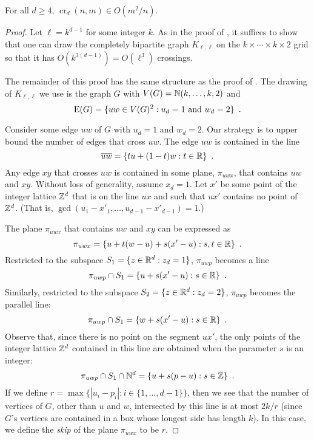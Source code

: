 \documentclass{patmorin}
\DeclareMathOperator{\crs}{cr}
\begin{document}
\begin{thm}
  For all $d\ge 4$, $\crs_d(n,m)\in O(m^2/n)$.
\end{thm}

\begin{proof}
  Let $\ell=k^{d-1}$ for some integer $k$.  As in the proof of
  , it suffices to show that one can draw the
  completely bipartite graph $K_{\ell,\ell}$ on the $k\times\cdots\times
  k\times 2$ grid so that it has $O(k^{3(d-1)})=O(\ell^3)$ crossings.

  The remainder of this proof has the same structure as the proof of
  .  The drawing of $K_{\ell,\ell}$ we use is the graph
  $G$ with $V(G)=\mathbb{N}(k,\ldots,k,2)$ and
  \[
    \mathrm{E}(G) = \{ uw\in V(G)^2 :\mbox{$u_d = 1$ and $w_d = 2$} \} \enspace .
  \]
  
  Consider some edge $uw$ of $G$ with $u_d=1$ and $w_d=2$.  Our strategy
  is to upper bound the number of edges that cross $uw$.  The edge $uw$
  is contained in the line
  \[  
    \overline{uw} = \{ tu + (1-t)w : t\in \mathbb{R} \} \enspace . 
  \]
  Any edge $xy$ that crosses $uw$ is contained in some plane, $\pi_{uwx}$,
  that contains $uw$ and $xy$.  Without loss of generality, assume
  $x_d=1$.  Let $x'$ be some point of the integer lattice $\mathbb{Z}^d$ that is
  on the line $ux$ and such that $ux'$ contains no point of $\mathbb{Z}^d$. (That
  is, $\gcd(u_1-x'_1,\ldots,u_{d-1}-x'_{d-1}) = 1$.)
  
  The plane $\pi_{uwx}$ that contains $uw$ and $xy$ can be expressed as
  \[
     \pi_{uwx} = \{ u + t(w-u) + s(x'-u) : s,t\in\mathbb{R}\} \enspace .
  \]
  Restricted to the subspace $S_1=\{z\in\mathbb{R}^d: z_d=1\}$, $\pi_{uwp}$
  becomes a line
  \[
     \pi_{uwp}\cap S_1 = \{ u + s(x'-u) : s\in\mathbb{R}\} \enspace .
  \]
  Similarly, restricted to the subspace $S_2=\{z\in\mathbb{R}^d: z_d=2\}$,
  $\pi_{uwp}$ becomes the parallel line:
  \[
     \pi_{uwp}\cap S_1 = \{ w + s(x'-u) : s\in\mathbb{R}\} \enspace .
  \]
  Observe that, since there is no point on the segment $ux'$, the only
  points of the integer lattice $\mathbb{Z}^d$ contained in this line are obtained
  when the parameter $s$ is an integer:
  \[
     \pi_{uwp}\cap S_1\cap\mathbb{N}^d = \{ u + s(p-u) : s\in\mathbb{Z}\} \enspace .
  \]
  If we define $r=\max\{|u_i-p_i| : i\in\{1,\ldots,d-1\}\}$, then
  we see that the number of vertices of $G$, other than $u$ and $w$,
  intersected by this line is at most $2k/r$ (since $G$'s vertices are
  contained in a box whose longest side has length $k$).  In this case,
  we define the \emph{skip} of the plane $\pi_{uwx}$ to be $r$.
  

\end{proof}
\end{document}
